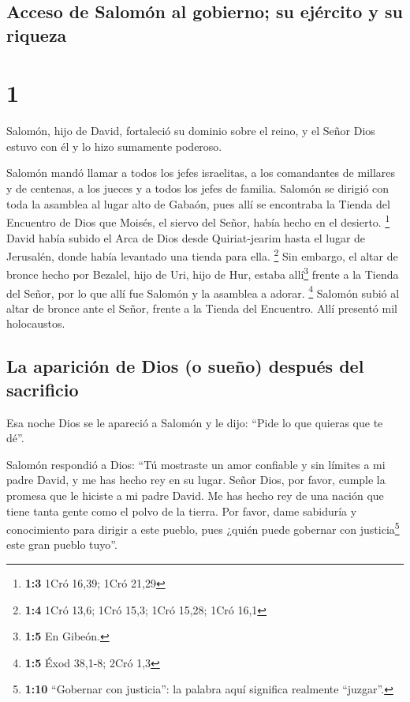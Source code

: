 \hypertarget{acceso-de-salomuxf3n-al-gobierno-su-ejuxe9rcito-y-su-riqueza}{%
\subsection{Acceso de Salomón al gobierno; su ejército y su
riqueza}\label{acceso-de-salomuxf3n-al-gobierno-su-ejuxe9rcito-y-su-riqueza}}

\hypertarget{section}{%
\section{1}\label{section}}

 Salomón, hijo de David, fortaleció su dominio sobre el
reino, y el Señor Dios estuvo con él y lo hizo sumamente poderoso.

 Salomón mandó llamar a todos los jefes israelitas, a los
comandantes de millares y de centenas, a los jueces y a todos los jefes
de familia.  Salomón se dirigió con toda la asamblea al
lugar alto de Gabaón, pues allí se encontraba la Tienda del Encuentro de
Dios que Moisés, el siervo del Señor, había hecho en el desierto.
\footnote{\textbf{1:3} 1Cró 16,39; 1Cró 21,29}  David
había subido el Arca de Dios desde Quiriat-jearim hasta el lugar de
Jerusalén, donde había levantado una tienda para ella. \footnote{\textbf{1:4}
  1Cró 13,6; 1Cró 15,3; 1Cró 15,28; 1Cró 16,1}  Sin
embargo, el altar de bronce hecho por Bezalel, hijo de Uri, hijo de Hur,
estaba allí\footnote{\textbf{1:5} En Gibeón.} frente a la Tienda del
Señor, por lo que allí fue Salomón y la asamblea a adorar. \footnote{\textbf{1:5}
  Éxod 38,1-8; 2Cró 1,3}  Salomón subió al altar de bronce
ante el Señor, frente a la Tienda del Encuentro. Allí presentó mil
holocaustos.

\hypertarget{la-apariciuxf3n-de-dios-o-sueuxf1o-despuuxe9s-del-sacrificio}{%
\subsection{La aparición de Dios (o sueño) después del
sacrificio}\label{la-apariciuxf3n-de-dios-o-sueuxf1o-despuuxe9s-del-sacrificio}}

 Esa noche Dios se le apareció a Salomón y le dijo: ``Pide
lo que quieras que te dé''.

 Salomón respondió a Dios: ``Tú mostraste un amor
confiable y sin límites a mi padre David, y me has hecho rey en su
lugar.  Señor Dios, por favor, cumple la promesa que le
hiciste a mi padre David. Me has hecho rey de una nación que tiene tanta
gente como el polvo de la tierra.  Por favor, dame
sabiduría y conocimiento para dirigir a este pueblo, pues ¿quién puede
gobernar con justicia\footnote{\textbf{1:10} ``Gobernar con justicia'':
  la palabra aquí significa realmente ``juzgar''.} este gran pueblo
tuyo''.

